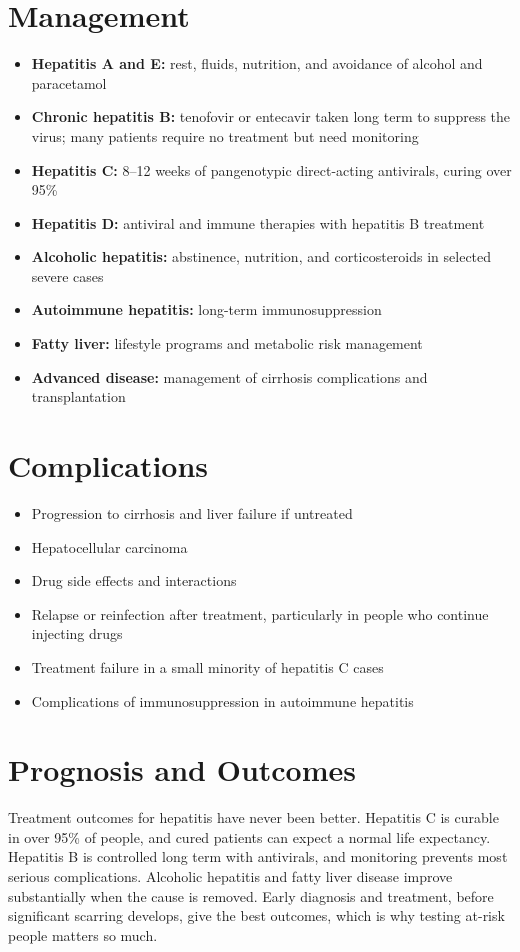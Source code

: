 \section*{Management}
\begin{itemize}
    \item \textbf{Hepatitis A and E:} rest, fluids, nutrition, and avoidance of alcohol and paracetamol
    \item \textbf{Chronic hepatitis B:} tenofovir or entecavir taken long term to suppress the virus; many patients require no treatment but need monitoring
    \item \textbf{Hepatitis C:} 8--12 weeks of pangenotypic direct-acting antivirals, curing over 95\%
    \item \textbf{Hepatitis D:} antiviral and immune therapies with hepatitis B treatment
    \item \textbf{Alcoholic hepatitis:} abstinence, nutrition, and corticosteroids in selected severe cases
    \item \textbf{Autoimmune hepatitis:} long-term immunosuppression
    \item \textbf{Fatty liver:} lifestyle programs and metabolic risk management
    \item \textbf{Advanced disease:} management of cirrhosis complications and transplantation
\end{itemize}

\section*{Complications}
\begin{itemize}
    \item Progression to cirrhosis and liver failure if untreated
    \item Hepatocellular carcinoma
    \item Drug side effects and interactions
    \item Relapse or reinfection after treatment, particularly in people who continue injecting drugs
    \item Treatment failure in a small minority of hepatitis C cases
    \item Complications of immunosuppression in autoimmune hepatitis
\end{itemize}

\section*{Prognosis and Outcomes}
Treatment outcomes for hepatitis have never been better. Hepatitis C is curable in over 95\% of people, and cured patients can expect a normal life expectancy. Hepatitis B is controlled long term with antivirals, and monitoring prevents most serious complications. Alcoholic hepatitis and fatty liver disease improve substantially when the cause is removed. Early diagnosis and treatment, before significant scarring develops, give the best outcomes, which is why testing at-risk people matters so much.

